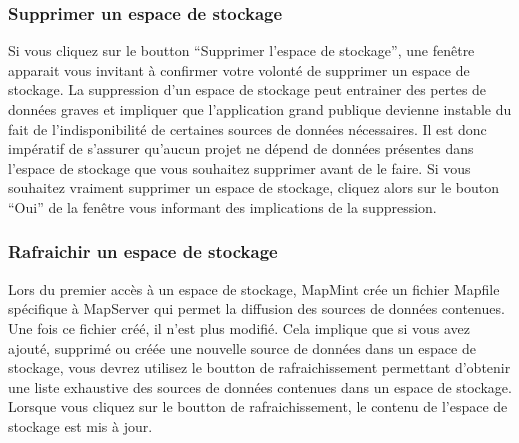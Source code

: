 \documentclass[letterpaper,10pt,french]{sphinxmanual}
\begin{document}
\subsubsection{Supprimer un espace de stockage}
\label{data/datastores:supprimer-un-espace-de-stockage}
Si vous cliquez sur le boutton ``Supprimer l’espace de stockage'', une
fenêtre apparait vous invitant à confirmer votre volonté de supprimer
un espace de stockage. La suppression d'un espace de stockage peut
entrainer des pertes de données graves et impliquer que l'application
grand publique devienne instable du fait de l'indisponibilité de
certaines sources de données nécessaires. Il est donc impératif de
s'assurer qu'aucun projet ne dépend de données présentes dans l'espace
de stockage que vous souhaitez supprimer avant de le faire. Si vous
souhaitez vraiment supprimer un espace de stockage, cliquez alors sur
le bouton ``Oui'' de la fenêtre vous informant des implications
de la suppression.


\subsubsection{Rafraichir un espace de stockage}
\label{data/datastores:rafraichir-un-espace-de-stockage}
Lors du premier accès à un espace de stockage, MapMint crée un fichier
Mapfile spécifique à MapServer qui permet la diffusion des sources de
données contenues. Une fois ce fichier créé, il n'est plus
modifié. Cela implique que si vous avez ajouté, supprimé ou créée une
nouvelle source de données dans un espace de stockage, vous devrez
utilisez le boutton de rafraichissement permettant d'obtenir une liste
exhaustive des sources de données contenues dans un espace de
stockage. Lorsque vous cliquez sur le boutton de rafraichissement, le
contenu de l'espace de stockage est mis à jour.
\end{document}
